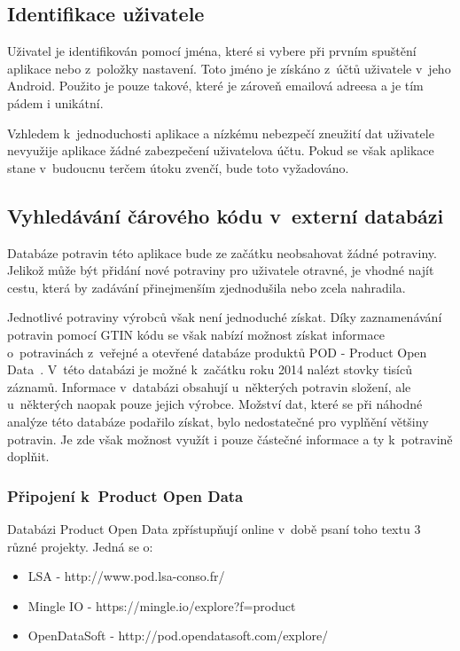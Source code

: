 \documentclass[thesis=B,czech]{FITthesis}[2013/10/20]
\begin{document}
\clearpage

\subsection{Identifikace uživatele}

Uživatel je identifikován pomocí jména, které si vybere při prvním spuštění aplikace nebo z~položky nastavení. Toto jméno je získáno z~účtů uživatele v~jeho Android. Použito je pouze takové, které je zároveň emailová adreesa a je tím pádem i unikátní.

Vzhledem k~jednoduchosti aplikace a nízkému nebezpečí zneužití dat uživatele nevyužije aplikace žádné zabezpečení uživatelova účtu. Pokud se však aplikace stane v~budoucnu terčem útoku zvenčí, bude toto vyžadováno.

\subsection{Vyhledávání čárového kódu v~externí databázi}

Databáze potravin této aplikace bude ze začátku neobsahovat žádné potraviny. Jelikož může být přidání nové potraviny pro uživatele otravné, je vhodné najít cestu, která by zadávání přinejmenším zjednodušila nebo zcela nahradila.

Jednotlivé potraviny výrobců však není jednoduché získat. Díky zaznamenávání potravin pomocí GTIN kódu se však nabízí možnost získat informace o~potravinách z~veřejné a otevřené databáze produktů POD - Product Open Data~\cite{pod}. V~této databázi je možné k~začátku roku 2014 nalézt stovky tisíců záznamů. Informace v~databázi obsahují u~některých potravin složení, ale u~některých naopak pouze jejich výrobce. Možství dat, které se při náhodné analýze této databáze podařilo získat, bylo nedostatečné pro vyplňění většiny potravin. Je zde však možnost využít i pouze částečné informace a ty k~potravině doplňit.

\subsubsection{Připojení k~Product Open Data}

Databázi Product Open Data zpřístupňují online v~době psaní toho textu 3 různé projekty. Jedná se o:
\begin{itemize}
  \item{LSA - http://www.pod.lsa-conso.fr/}
  \item{Mingle IO - https://mingle.io/explore?f=product}
  \item{OpenDataSoft - http://pod.opendatasoft.com/explore/}
\end{itemize}
\end{document}
